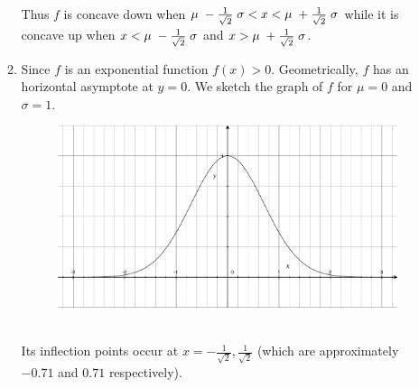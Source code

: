 \documentclass[12pt]{amsart}
\begin{document}
\begin{enumerate}
\begin{enumerate}
			Thus $f$ is concave down when $\mu\hspace{0.1cm}-\frac{1}{\sqrt{2}}\hspace{0.1cm}\sigma 				<x<\mu \hspace{0.1cm}+\frac{1}{\sqrt{2}} \hspace{0.1cm} \sigma$ while it is concave up when 			$x< \mu \hspace{0.1cm} - \frac{1}{\sqrt{2}}\hspace{0.1cm} \sigma$ and $x>\mu \hspace{0.1cm}			+\frac{1}{\sqrt{2}} \hspace{0.1cm}\sigma$.\\

			\item
			Since $f$ is an exponential function $f(x)>0$.  Geometrically, $f$ has an horizontal 
			asymptote at $y=0$. We sketch the graph of $f$ for $\mu=0$ and $\sigma=1$.							\begin{figure}[h]
					\centering
					\includegraphics[width=5in]{3f.pdf}
				\end{figure} \\
			Its inflection points occur at $x=-\frac{1}{\sqrt{2}}, \frac{1}{\sqrt{2}}$ (which are approximately 				$-0.71$ and $0.71$ respectively).  \\
		
		\end{enumerate}
	

\end{enumerate}
\end{document}
